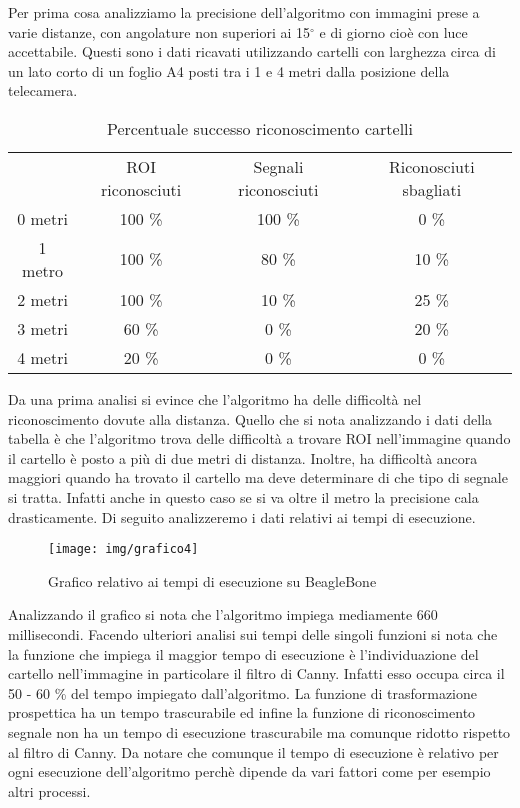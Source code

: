 	Per prima cosa analizziamo la precisione dell'algoritmo con immagini prese a varie distanze, con angolature non superiori ai 15$^{\circ}$ e di giorno cioè con luce accettabile. Questi sono i dati ricavati utilizzando cartelli con larghezza circa di un lato corto di un foglio A4 posti tra i 1 e 4 metri dalla posizione della telecamera.

	\begin{table}[h]
		\centering
		\begin{tabular}{cccc}
		        & ROI riconosciuti & Segnali riconosciuti & Riconosciuti sbagliati \\
			0 metri & 100 \%                & 100 \%  &	0 \%             \\
			1 metro & 100 \%                & 80 \%   &	10 \%               \\
			2 metri & 100 \%                 & 10 \%  &	25 \%  	            \\
			3 metri & 60 \%                  & 0 \%   &	20 \% 	              \\
			4 metri & 20 \%                  & 0 \%   &	0 \% 	             
		\end{tabular}
		\caption{Percentuale successo riconoscimento cartelli}
	\end{table}

    Da una prima analisi si evince che l'algoritmo ha delle difficoltà nel riconoscimento dovute alla distanza. Quello che si nota analizzando i dati della tabella è che l'algoritmo trova delle difficoltà a trovare ROI nell'immagine quando il cartello è posto a più di due metri di distanza. Inoltre, ha difficoltà ancora maggiori quando ha trovato il cartello ma deve determinare di che tipo di segnale si tratta. Infatti anche in questo caso se si va oltre il metro la precisione cala drasticamente. Di seguito analizzeremo i dati relativi ai tempi di esecuzione.

    \begin{figure}[!ht]
		\centering
		\texttt{[image: img/grafico4]}
		\caption[Grafico tempi di esecuzione]{Grafico relativo ai tempi di esecuzione su BeagleBone}
	\end{figure}

	Analizzando il grafico si nota che l'algoritmo impiega mediamente 660 millisecondi. Facendo ulteriori analisi sui tempi delle singoli funzioni si nota che la funzione che impiega il maggior tempo di esecuzione è l'individuazione del cartello nell'immagine in particolare il filtro di Canny. Infatti esso occupa circa il 50 - 60 \% del tempo impiegato dall'algoritmo. La funzione di trasformazione prospettica ha un tempo trascurabile ed infine la funzione di riconoscimento segnale non ha un tempo di esecuzione trascurabile ma comunque ridotto rispetto al filtro di Canny. Da notare che comunque il tempo di esecuzione è relativo per ogni esecuzione dell'algoritmo perchè dipende da vari fattori come per esempio altri processi.


